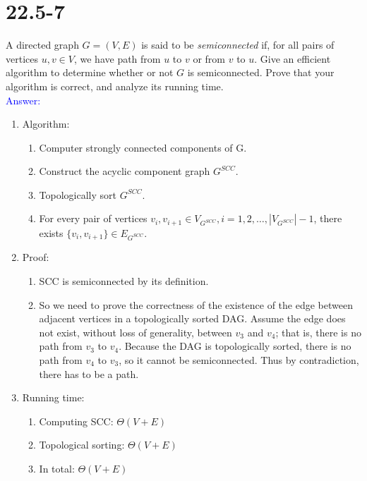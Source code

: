 \documentclass[a4paper]{article}
\begin{document}
\section{22.5-7} A directed graph $ G= (V, E)$ is said to be \textit{semiconnected} if, for all pairs of vertices $u, v \in V$, we have path from $u$ to $v$ or from $v$ to $u$. Give an efficient algorithm to determine whether or not $G$ is semiconnected. Prove that your algorithm is correct, and analyze its running time.\\
\textcolor{blue}{Answer:}
    \begin{enumerate}
        \item Algorithm:
            \begin{enumerate}
                \item Computer strongly connected components of G.
                \item Construct the acyclic component graph $G^{SCC}$.
                \item Topologically sort $G^{SCC}$.
                \item For every pair of vertices $v_i,v_{i+1}\in V_{G^{SCC}}, i=1,2,\ldots, |V_{G^{SCC}}|-1$, there exists $ \{v_i,v_{i+1}\}\in E_{G^{SCC}}$.
            \end{enumerate}
        \item Proof:
            \begin{enumerate}
                \item SCC is semiconnected by its definition.
                \item So we need to prove the correctness of the existence of the edge between adjacent vertices in a topologically sorted DAG. Assume the edge does not exist, without loss of generality, between $v_3$ and $v_4$; that is, there is no path from $v_3$ to $v_4$. Because the DAG is topologically sorted, there is no path from $v_4$ to $v_3$, so it cannot be semiconnected. Thus by contradiction, there has to be a path.
            \end{enumerate}
        \item Running time:
            \begin{enumerate}
                \item Computing SCC: $\Theta(V+E)$
                \item Topological sorting: $\Theta(V+E)$
                \item In total: $\Theta(V+E)$
            \end{enumerate}
    \end{enumerate}
\end{document}
